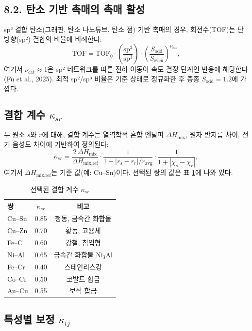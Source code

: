 \documentclass[12pt,a4paper]{article}
\begin{document}
	\subsection*{8.2. 탄소 기반 촉매의 촉매 활성}
	sp² 결합 탄소(그래핀, 탄소 나노튜브, 탄소 점) 기반 촉매의 경우, 회전수(TOF)는 단방향(sp²) 결합의 비율에 비례한다:
	\[
	\text{TOF} = \text{TOF}_0 \cdot \left( \frac{\text{sp}^2}{\text{sp}^3} \right) \cdot \left( \frac{S_{\text{odd}}}{S_{\text{even}}} \right)^{\nu_{\text{cat}}},
	\]
	여기서 \(\nu_{\text{cat}} \approx 1\)은 sp² 네트워크를 따른 전하 이동이 속도 결정 단계인 반응에 해당한다 (Fu et al., 2025). 최적 sp²/sp³ 비율은 기준 상태로 정규화한 후 종종 \(S_{\text{odd}} = 1.2\)에 가깝다.
	
	\subsection{결합 계수 \(\kappa_{sr}\)}
	
	두 원소 \(s\)와 \(r\)에 대해, 결합 계수는 열역학적 혼합 엔탈피 \(\Delta H_{\text{mix}}\), 원자 반지름 차이, 전기 음성도 차이에 기반하여 정의된다:
	\[
	\kappa_{sr} = \frac{2\,\Delta H_{\text{mix}}}{\Delta H_{\text{mix,ref}}} \cdot
	\frac{1}{1 + |r_s - r_r|/r_{\text{avg}}} \cdot
	\frac{1}{1 + |\chi_s - \chi_r|},
	\]
	여기서 \(\Delta H_{\text{mix,ref}}\)는 기준 값(예: Cu–Sn)이다. 선택된 쌍의 값은 표 \ref{tab:kappa}에 나와 있다.
	
	\begin{table}[htbp]
		\centering
		\caption{선택된 결합 계수 \(\kappa_{sr}\)}
		\label{tab:kappa}
		\begin{tabular}{lcc}
			\toprule
			쌍 & \(\kappa_{sr}\) & 비고 \\
			\midrule
			Cu–Sn & 0.85 & 청동, 금속간 화합물 \\
			Cu–Zn & 0.70 & 황동, 고용체 \\
			Fe–C  & 0.60 & 강철, 침입형 \\
			Ni–Al & 0.65 & 금속간 화합물 Ni\(_{3}\)Al \\
			Fe–Cr & 0.40 & 스테인리스강 \\
			Co–Cr & 0.50 & 코발트 합금 \\
			Au–Cu & 0.55 & 보석 합금 \\
			\bottomrule
		\end{tabular}
	\end{table}
	
	\subsection{특성별 보정 \(\kappa_{ij}\)}
	\label{subsec:property-calibration}
	
\end{document}
